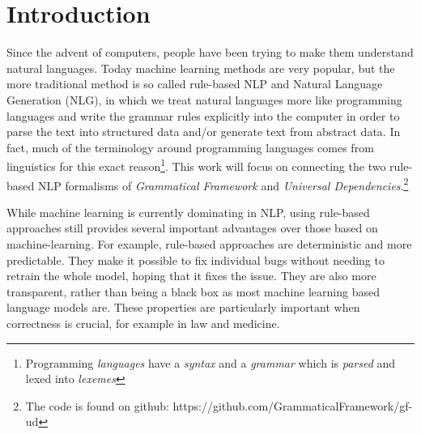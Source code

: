 \chapter{Introduction}

\newcommand{\note}[1]{\todo{#1}}


Since the advent of computers, people have been trying to make them understand natural languages. Today machine learning methods are very popular, but the more traditional method is so called rule-based
\ac{NLP}
and Natural Language Generation (NLG), in which we treat natural languages more like programming languages and write the grammar rules explicitly into the computer in order to parse the text into structured data and/or generate text from abstract data.\cite{chomsky-1957,lambek-1958,curry1961some}
In fact, much of the terminology around programming languages comes from linguistics for this exact reason\footnote{Programming \emph{languages} have a \emph{syntax} and a \emph{grammar} which is \emph{parsed} and lexed into \emph{lexemes}}. This work will focus on connecting the two rule-based \ac{NLP} formalisms of \emph{Grammatical Framework}\cite{ranta-2011} and \emph{Universal Dependencies}\cite{nivre-etal-2016-universal}.\footnote{The code is found on github: https://github.com/GrammaticalFramework/gf-ud}


While machine learning is currently dominating in \ac{NLP}, using rule-based approaches still provides several important advantages over those based on machine-learning.
For example, rule-based approaches are deterministic and more predictable. They make it possible to fix individual bugs without needing to retrain the whole model, hoping that it fixes the issue. They are also more transparent, rather than being a black box as most machine learning based language models are. %
These properties are particularly important when correctness is crucial, for example in law and medicine.

